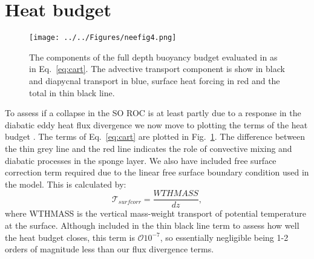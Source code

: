 \section{Heat budget}

\begin{figure}
\noindent \texttt{[image: ../../Figures/neefig4.png]} 
\caption{The components of the full depth buoyancy budget evaluated in as in Eq.~\ref{eq:cart}. The advective transport component is show in black and diapycnal transport in blue, surface heat forcing in red and the total in thin black line.}
\label{fig:tembb_fix}
\end{figure}

To assess if a collapse in the SO ROC is at least partly due to a response in the diabatic eddy heat flux divergence we now move to plotting the terms of the heat budget . The terms of Eq.~\ref{eq:cart} are plotted in Fig.~\ref{fig:tembb_fix}. The difference between the thin grey line and the red line indicates the role of convective mixing and diabatic processes in the sponge layer. We also have included free surface correction term required due to the linear free surface boundary condition used in the model. This is calculated by:
\begin{equation}
\mathcal{T}_{surfcorr} = \frac{WTHMASS}{dz},
\label{eq:surcor}
\end{equation}
where WTHMASS is the vertical mass-weight transport of potential temperature at the surface. Although included in the thin black line term to assess how well the heat budget closes, this term is $\mathcal{O}10^{-7}$, so essentially negligible being 1-2 orders of magnitude less than our flux divergence terms.
